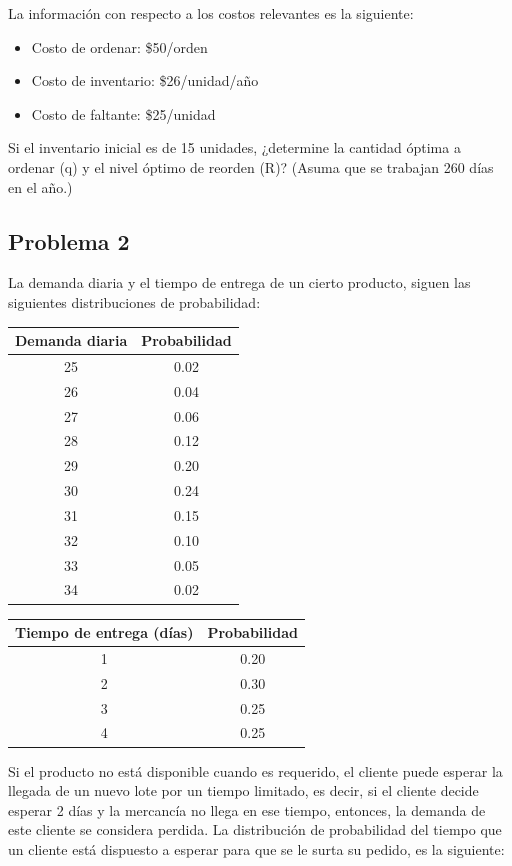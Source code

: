 \documentclass[12pt]{article}
\begin{document}
La información con respecto a los costos relevantes es la siguiente:

\begin{itemize}
    \item Costo de ordenar: \$50/orden
    \item Costo de inventario: \$26/unidad/año
    \item Costo de faltante: \$25/unidad
\end{itemize}

Si el inventario inicial es de 15 unidades, ¿determine la cantidad óptima a ordenar (q) y el nivel óptimo de reorden (R)? (Asuma que se trabajan 260 días en el año.)

\subsection{Problema 2}

La demanda diaria y el tiempo de entrega de un cierto producto, siguen las siguientes distribuciones de probabilidad:

\begin{center}
\begin{tabular}{cc}
\toprule
Demanda diaria & Probabilidad \\
\midrule
25 & 0.02 \\
26 & 0.04 \\
27 & 0.06 \\
28 & 0.12 \\
29 & 0.20 \\
30 & 0.24 \\
31 & 0.15 \\
32 & 0.10 \\
33 & 0.05 \\
34 & 0.02 \\
\bottomrule
\end{tabular}
\qquad
\begin{tabular}{cc}
\toprule
Tiempo de entrega (días) & Probabilidad \\
\midrule
1 & 0.20 \\
2 & 0.30 \\
3 & 0.25 \\
4 & 0.25 \\
\bottomrule
\end{tabular}
\end{center}

Si el producto no está disponible cuando es requerido, el cliente puede esperar la llegada de un nuevo lote por un tiempo limitado, es decir, si el cliente decide esperar 2 días y la mercancía no llega en ese tiempo, entonces, la demanda de este cliente se considera perdida. La distribución de probabilidad del tiempo que un cliente está dispuesto a esperar para que se le surta su pedido, es la siguiente:
\end{document}
